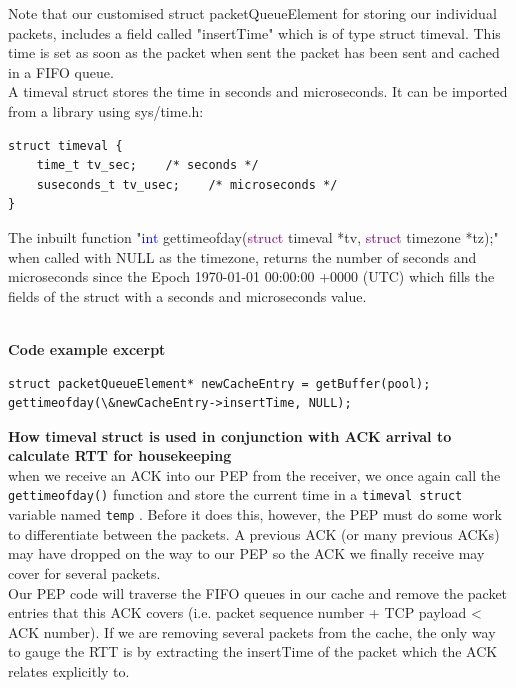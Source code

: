 Note that our customised struct packetQueueElement for storing our individual packets, includes a field called "insertTime" which is of type struct timeval. This time is set as soon as the packet when sent the packet has been sent and cached in a FIFO queue.\\

A timeval struct stores the time in seconds and microseconds. It can be imported from a library using sys/time.h: \\


\begin{lstlisting}
struct timeval { 
    time_t tv_sec;    /* seconds */
    suseconds_t tv_usec;    /* microseconds */
} 
\end{lstlisting}

The inbuilt function "\textcolor{blue}{int} gettimeofday(\textcolor{purple}{struct} timeval *tv, \textcolor{purple}{struct} timezone *tz);" when called with NULL as the timezone, returns the number of seconds and microseconds since the Epoch  1970-01-01 00:00:00 +0000 (UTC) which fills the fields of the struct with a seconds and microseconds value. 

\\

\textbf{Code example excerpt}
\begin{lstlisting}
struct packetQueueElement* newCacheEntry = getBuffer(pool); 
gettimeofday(\&newCacheEntry->insertTime, NULL);
\end{lstlisting}

\noindent \textbf{How timeval struct is used in conjunction with ACK arrival to calculate RTT for housekeeping}\\
when we receive an ACK into our PEP from the receiver, we once again call the {\tt gettimeofday()} function and store the current time in a {\tt timeval struct} variable named {\tt temp} . Before it does this, however, the PEP must do some work to differentiate between the packets. A previous ACK (or many previous ACKs) may have dropped on the way to our PEP so the ACK we finally receive may cover for several packets. \\

Our PEP code will traverse the FIFO queues in our cache and remove the packet entries that this ACK covers (i.e. packet sequence number + TCP payload < ACK number). If we are removing several packets from the cache, the only way to gauge the RTT is by extracting the insertTime of the packet which the ACK relates explicitly to. \\

